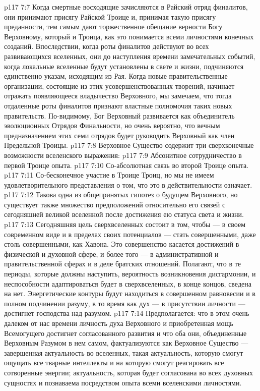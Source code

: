 \vs p117 7:7 \pc Когда смертные восходящие зачисляются в Райский отряд финалитов, они принимают присягу Райской Троице и, принимая такую присягу преданности, тем самым дают торжественное обещание верности Богу Верховному, который и  Троица, как это понимается всеми личностями конечных созданий. Впоследствии, когда роты финалитов действуют во всех развивающихся вселенных, они до наступления времени замечательных событий, когда локальные вселенные будут установлены в свете и жизни, подчиняются единственно указам, исходящим из Рая. Когда новые правительственные организации, состоящие из этих усовершенствованных творений, начинает отражать появляющееся владычество Верховного, мы замечаем, что тогда отдаленные роты финалитов признают властные полномочия таких новых правительств. По\hyp{}видимому, Бог Верховный развивается как объединитель эволюционных Отрядов Финальности, но очень вероятно, что вечным предназначением этих семи отрядов будет руководить Верховный как член Предельной Троицы.
\vs p117 7:8 \pc Верховное Существо содержит три сверхконечные возможности вселенского выражения:
\vs p117 7:9 \bibnobreakspace Абсонитное сотрудничество в первой Троице опыта.
\vs p117 7:10 \bibnobreakspace Со\hyp{}абсолютная связь во второй Троице опыта.
\vs p117 7:11 \bibnobreakspace Со\hyp{}бесконечное участие в Троице Троиц, но мы не имеем удовлетворительного представления о том, что это в действительности означает.
\vs p117 7:12 \pc Такова одна из общепринятых гипотез о будущем Верховного, но существует также множество предположений относительно его связей с сегодняшней великой вселенной после достижения ею статуса света и жизни.
\vs p117 7:13 Сегодняшняя цель сверхвселенных состоит в том, чтобы --- в своем современном виде и в пределах своих потенциалов --- стать совершенными, даже столь совершенными, как Хавона. Это совершенство касается достижений в физической и духовной сфере, и более того --- в административной и правительственной сферах и в деле братских отношений. Полагают, что в те периоды, которые должны наступить, вероятность возникновения дисгармонии, и неспособности адаптироваться будет в сверхвселенных, в конце концов, сведена на нет. Энергетические контуры будут находиться в совершенном равновесии и в полном подчинении разуму, в то время как дух --- в присутствии личности --- достигнет господства над разумом.
\vs p117 7:14 Предполагается: что в этом очень далеком от нас времени личность духа Верховного и приобретенная мощь Всемогущего достигнет согласованного развития и что оба они, объединенные Верховным Разумом в нем самом, фактуализуются как Верховное Существо --- завершенная актуальность во вселенных, такая актуальность, которую смогут ощущать все тварные интеллекты и на которую смогут реагировать все сотворенные энергии; актуальность, которая будет согласована во всех духовных сущностях и познаваема посредством опыта всеми вселенскими личностями.
